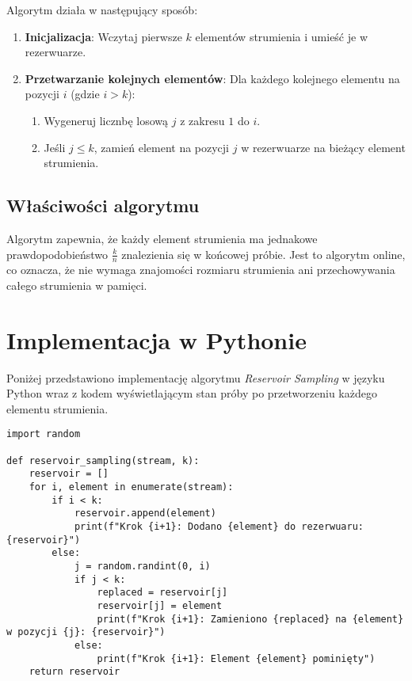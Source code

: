 \documentclass{article}
\begin{document}
Algorytm działa w następujący sposób:

\begin{enumerate}
    \item \textbf{Inicjalizacja}: Wczytaj pierwsze $k$ elementów strumienia i umieść je w rezerwuarze.
    \item \textbf{Przetwarzanie kolejnych elementów}: Dla każdego kolejnego elementu na pozycji $i$ (gdzie $i > k$):
    \begin{enumerate}
        \item Wygeneruj licznbę losową $j$ z zakresu $1$ do $i$.
        \item Jeśli $j \leq k$, zamień element na pozycji $j$ w rezerwuarze na bieżący element strumienia.
    \end{enumerate}
\end{enumerate}

\subsection{Właściwości algorytmu}

Algorytm zapewnia, że każdy element strumienia ma jednakowe prawdopodobieństwo $\frac{k}{n}$ znalezienia się w końcowej próbie. Jest to algorytm online, co oznacza, że nie wymaga znajomości rozmiaru strumienia ani przechowywania całego strumienia w pamięci.

\section{Implementacja w Pythonie}

Poniżej przedstawiono implementację algorytmu \textit{Reservoir Sampling} w języku Python wraz z kodem wyświetlającym stan próby po przetworzeniu każdego elementu strumienia.

\begin{lstlisting}[style=pystyle, caption=Implementacja algorytmu \textit{Reservoir Sampling}]
import random

def reservoir_sampling(stream, k):
    reservoir = []
    for i, element in enumerate(stream):
        if i < k:
            reservoir.append(element)
            print(f"Krok {i+1}: Dodano {element} do rezerwuaru: {reservoir}")
        else:
            j = random.randint(0, i)
            if j < k:
                replaced = reservoir[j]
                reservoir[j] = element
                print(f"Krok {i+1}: Zamieniono {replaced} na {element} w pozycji {j}: {reservoir}")
            else:
                print(f"Krok {i+1}: Element {element} pominięty")
    return reservoir
\end{lstlisting}
\end{document}
